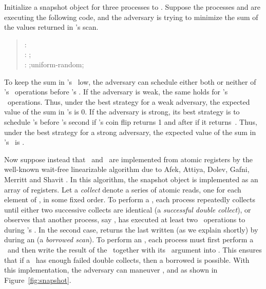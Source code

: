 \documentclass[11pt,letterpaper]{article}
\begin{document}
Initialize a snapshot object for three processes to .
Suppose the processes  and  are executing the following code,
and the adversary is trying to minimize the sum of the values returned in 's scan.

\begin{quote}
\medskip
\noindent
:    \\
:  ;\quad  \\
:  ;\quad  uniform-random;\quad 
\end{quote}
\medskip

To keep the sum in 's \Scan\ low,
the adversary can schedule either both or neither of 's \Update\ operations before 's \Scan.
If the adversary is weak, the same holds for 's \Update\ operations.
Thus, under the best strategy for a weak adversary, the expected value of the sum in 's \Scan is 0.
If the adversary is strong,
its best strategy is to schedule 's \Scan before 's second \Update if 's coin flip returns 1
and after if it returns~.
Thus, under the best strategy for a strong adversary, the expected value
of the sum in 's \Scan\ is .

Now suppose instead that \Update\ and \Scan\ are implemented from atomic registers
by the well-known wait-free linearizable algorithm due to Afek, Attiya, Dolev, Gafni, Merritt and Shavit \cite{aadgms:snapshots}.
In this algorithm, the snapshot object is implemented as an array  of registers.
Let a \emph{collect} denote a series of  atomic reads, one for each element of , in some fixed order.
To perform a \Scan, each process  repeatedly collects until either two successive collects are
identical (a \emph{successful double collect}),
or  observes that another process, say , has executed at least two \Update\ operations to  during 's \Scan.
In the second case,  returns the last \Scan written (as we explain shortly) by  during an \Update (a \emph{borrowed scan}).
To perform an \Update, each process  must first perform a \Scan\ and then write the result of the \Scan\
together with its \Update\ argument into .
This ensures that if a \Scan\ has enough failed double collects, then a borrowed \Scan is possible.
With this implementation, the adversary can maneuver ,  and  as shown in Figure~\ref{fig:snapshot}.
\end{document}
